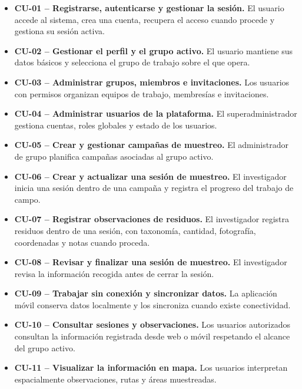 \begin{itemize}
\item \textbf{CU-01 -- Registrarse, autenticarse y gestionar la sesión.} El
usuario accede al sistema, crea una cuenta, recupera el acceso cuando procede y
gestiona su sesión activa.

\item \textbf{CU-02 -- Gestionar el perfil y el grupo activo.} El usuario
mantiene sus datos básicos y selecciona el grupo de trabajo sobre el que opera.

\item \textbf{CU-03 -- Administrar grupos, miembros e invitaciones.} Los usuarios
con permisos organizan equipos de trabajo, membresías e invitaciones.

\item \textbf{CU-04 -- Administrar usuarios de la plataforma.} El
superadministrador gestiona cuentas, roles globales y estado de los usuarios.

\item \textbf{CU-05 -- Crear y gestionar campañas de muestreo.} El administrador
de grupo planifica campañas asociadas al grupo activo.

\item \textbf{CU-06 -- Crear y actualizar una sesión de muestreo.} El
investigador inicia una sesión dentro de una campaña y registra el progreso del
trabajo de campo.

\item \textbf{CU-07 -- Registrar observaciones de residuos.} El investigador
registra residuos dentro de una sesión, con taxonomía, cantidad, fotografía,
coordenadas y notas cuando proceda.

\item \textbf{CU-08 -- Revisar y finalizar una sesión de muestreo.} El
investigador revisa la información recogida antes de cerrar la sesión.

\item \textbf{CU-09 -- Trabajar sin conexión y sincronizar datos.} La aplicación
móvil conserva datos localmente y los sincroniza cuando existe conectividad.

\item \textbf{CU-10 -- Consultar sesiones y observaciones.} Los usuarios
autorizados consultan la información registrada desde web o móvil respetando el
alcance del grupo activo.

\item \textbf{CU-11 -- Visualizar la información en mapa.} Los usuarios
interpretan espacialmente observaciones, rutas y áreas muestreadas.


\end{itemize}
